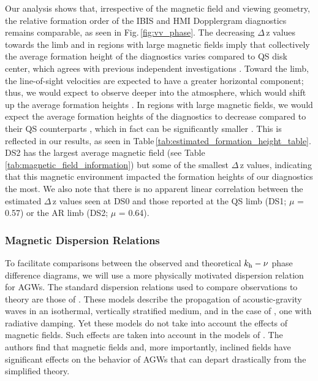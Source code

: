 \documentclass[preprint2,linenumbers]{aastex701}
\begin{document}
Our analysis shows that, irrespective of the magnetic field and viewing geometry, the relative formation order of the IBIS and HMI Dopplergram diagnostics remains comparable, as seen in Fig.\,\ref{fig:vv_phase}.
The decreasing $\Delta$\,z values towards the limb and in regions with large magnetic fields imply that collectively the average formation height of the diagnostics varies compared to QS disk center, which agrees with previous independent investigations \citep{2012_Faurobert_Ricort_Aime, 2017_QuinteroNoda}.
Toward the limb, the line-of-sight velocities are expected to have a greater horizontal component; thus, we would expect to observe deeper into the atmosphere, which would shift up the average formation heights \citep{2012_Faurobert_Ricort_Aime}.
In regions with large magnetic fields, we would expect the average formation heights of the diagnostics to decrease compared to their QS counterparts \citep{2003_Uitenbroek, 2017_QuinteroNoda, 2020_Vigeesh_Roth}, which in fact can be significantly smaller \citep[e.g., Fig.\,9 in][]{2017_QuinteroNoda}.
This is reflected in our results, as seen in Table\,\ref{tab:estimated_formation_height_table}.
DS2 has the largest average magnetic field (see Table\,\ref{tab:magnetic_field_information}) but some of the smallest $\Delta$\,z values, indicating that this magnetic environment impacted the formation heights of our diagnostics the most. 
We also note that there is no apparent linear correlation between the estimated $\Delta$\,z values seen at DS0 and those reported at the QS limb (DS1; $\mu$ = 0.57) or the AR limb (DS2; $\mu$ = 0.64).

\subsubsection{Magnetic Dispersion Relations}
\label{subsubsec:magnetic_dispersions}

To facilitate comparisons between the observed and theoretical $k_{\rm{h}}-\nu$ phase difference diagrams, we will use a more physically motivated dispersion relation for AGWs.
The standard dispersion relations used to compare observations to theory are those of 
\citet{1966_Souffrin, 1981_Mihalas_Toomre, 1982_Mihalas_Toomre}. These models describe the propagation of acoustic-gravity waves in an isothermal, vertically stratified medium, and in the case of \citet{1966_Souffrin, 1982_Mihalas_Toomre}, one with radiative damping. Yet these models do not take into account the effects of magnetic fields. Such effects are taken into account in the models of \citet{2006_Schunker_Cally, 2009_Newington_Cally}. The authors find that magnetic fields and, more importantly, inclined fields have significant effects on the behavior of AGWs that can depart drastically from the simplified theory. 
\end{document}
